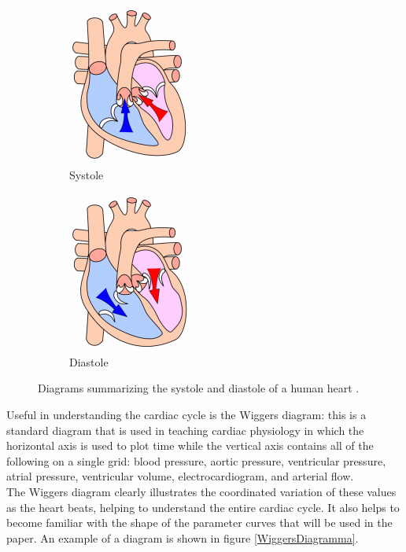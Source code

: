 \begin{figure}[h]
\centering
\begin{subfigure}{0.5\textwidth}
  \centering
  \includegraphics[width=0.5\linewidth]{images/Windkessel/sistole.png}
  \caption{Systole}
\end{subfigure}%
\begin{subfigure}{0.5\textwidth}
  \centering
  \includegraphics[width=0.5\linewidth]{images/Windkessel/diastole.png}
  \caption{Diastole}
\end{subfigure}
\caption{Diagrams summarizing the systole and diastole of a human heart \cite{wiki:cicloCardiaco}.}
\label{sistoleDiastole}
\end{figure}

\newpage



\newpage

Useful in understanding the cardiac cycle is the Wiggers diagram: this is a standard diagram that is used in teaching cardiac physiology in which the horizontal axis is used to plot time while the vertical axis contains all of the following on a single grid: blood pressure, aortic pressure, ventricular pressure, atrial pressure, ventricular volume, electrocardiogram, and arterial flow.\\
The Wiggers diagram clearly illustrates the coordinated variation of these values as the heart beats, helping to understand the entire cardiac cycle. It also helps to become familiar with the shape of the parameter curves that will be used in the paper. An example of a diagram is shown in figure \ref{WiggersDiagramma}.


